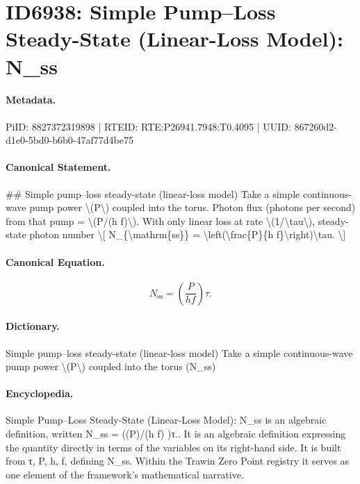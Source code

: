 \section*{ID6938: Simple Pump–Loss Steady-State (Linear-Loss Model): N\_ss}
\paragraph{Metadata.}
PiID: 8827372319898 | RTEID: RTE:P26941.7948:T0.4095 | UUID: 867260d2-d1e0-5bd0-b6b0-47af77d4be75

\paragraph{Canonical Statement.}
\#\# Simple pump–loss steady-state (linear-loss model) Take a simple continuous-wave pump power \textbackslash{}(P\textbackslash{}) coupled into the torus. Photon flux (photons per second) from that pump = \textbackslash{}(P/(h f)\textbackslash{}). With only linear loss at rate \textbackslash{}(1/\textbackslash{}tau\textbackslash{}), steady-state photon number \textbackslash{}[ N\_\{\textbackslash{}mathrm\{ss\}\} = \textbackslash{}left(\textbackslash{}frac\{P\}\{h f\}\textbackslash{}right)\textbackslash{}tau. \textbackslash{}]

\paragraph{Canonical Equation.}
\[
N_{\mathrm{ss}} = \left(\frac{P}{h f}\right)\tau.
\]

\paragraph{Dictionary.}
Simple pump–loss steady-state (linear-loss model) Take a simple continuous-wave pump power \textbackslash{}(P\textbackslash{}) coupled into the torus (N\_ss)

\paragraph{Encyclopedia.}
Simple Pump–Loss Steady-State (Linear-Loss Model): N\_ss is an algebraic definition, written N\_ss = ((P)/(h f) )τ.. It is an algebraic definition expressing the quantity directly in terms of the variables on its right-hand side. It is built from τ, P, h, f, defining N\_ss. Within the Trawin Zero Point registry it serves as one element of the framework's mathematical narrative.

